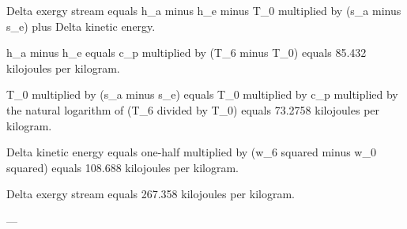 Delta exergy stream equals h_a minus h_e minus T_0 multiplied by (s_a minus s_e) plus Delta kinetic energy.  

h_a minus h_e equals c_p multiplied by (T_6 minus T_0) equals 85.432 kilojoules per kilogram.  

T_0 multiplied by (s_a minus s_e) equals T_0 multiplied by c_p multiplied by the natural logarithm of (T_6 divided by T_0) equals 73.2758 kilojoules per kilogram.  

Delta kinetic energy equals one-half multiplied by (w_6 squared minus w_0 squared) equals 108.688 kilojoules per kilogram.  

Delta exergy stream equals 267.358 kilojoules per kilogram.  

---